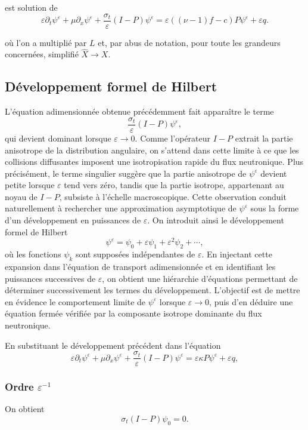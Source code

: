 \documentclass{article}
\begin{document}
est solution de 
\begin{equation}
    \varepsilon\partial_t\psi^{\varepsilon} + \mu\partial_x\psi^{\varepsilon} + \frac{\sigma_t}{\varepsilon}(I-P)\psi^{\varepsilon} = \varepsilon((\nu-1)f -c)P\psi^{\varepsilon} + \varepsilon q.
\end{equation}

où l'on a multiplié par \(L\) et, par abus de notation, pour toute les grandeurs concernées, simplifié \(\hat{X} \to X\).

\subsection{Développement formel de Hilbert}
L'équation adimensionnée obtenue précédemment fait apparaître le terme 
\[ \frac{\sigma_t}{\varepsilon}(I-P)\psi^\varepsilon, \]
qui devient dominant lorsque \(\varepsilon\to0\). Comme l'opérateur \(I-P\) extrait la partie anisotrope de la distribution angulaire, on s'attend dans cette limite à ce que les collisions diffusantes imposent une isotropisation rapide du flux neutronique. Plus précisément, le terme singulier suggère que la partie anisotrope de \(\psi^\varepsilon\) devient petite lorsque \(\varepsilon\) tend vers zéro, tandis que la partie isotrope, appartenant au noyau de \(I-P\), subsiste à l'échelle macroscopique. Cette observation conduit naturellement à rechercher une approximation asymptotique de \(\psi^\varepsilon\) sous la forme d'un développement en puissances de \(\varepsilon\). On introduit ainsi le développement formel de Hilbert 
\[ 
\psi^\varepsilon = \psi_0+\varepsilon\psi_1+\varepsilon^2\psi_2+\cdots, 
\] 
où les fonctions \(\psi_k\) sont supposées indépendantes de \(\varepsilon\). En injectant cette expansion dans l'équation de transport adimensionnée et en identifiant les puissances successives de \(\varepsilon\), on obtient une hiérarchie d'équations permettant de déterminer successivement les termes du développement. L'objectif est de mettre en évidence le comportement limite de \(\psi^\varepsilon\) lorsque \(\varepsilon\to0\), puis d'en déduire une équation fermée vérifiée par la composante isotrope dominante du flux neutronique.

En substituant le développement précédent dans l'équation 
\[\varepsilon\partial_t\psi^\varepsilon + \mu\partial_x\psi^\varepsilon + \frac{\sigma_t}{\varepsilon}(I-P)\psi^\varepsilon = \varepsilon\kappa P\psi^\varepsilon + \varepsilon q, \] 

\subsubsection{Ordre \(\varepsilon^{-1}\)} 
On obtient 
\[  \sigma_t(I-P)\psi_0 = 0. \]
\end{document}
